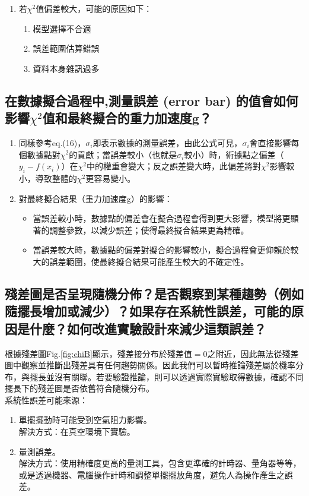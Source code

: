 \documentclass[12pt,a4paper]{article}
\begin{document}
\begin{CJK}{UTF8}{bkai}
\begin{enumerate}
    \item 若$\chi^2$值偏差較大，可能的原因如下：
    \begin{enumerate}
        \item 模型選擇不合適
        \item 誤差範圍估算錯誤
        \item 資料本身雜訊過多
    \end{enumerate}
        
\end{enumerate}

\subsection{在數據擬合過程中,測量誤差 (error bar) 的值會如何影響$\chi^2$值和最終擬合的重力加速度g？}
\hfill
\begin{enumerate}
    \item 同樣參考eq.(16)，$\sigma_i$即表示數據的測量誤差，由此公式可見，$\sigma_i$會直接影響每個數據點對$\chi^2$的貢獻；當誤差較小（也就是$\sigma_i$較小）時，術據點之偏差（$y_i - f(x_i)$）在$\chi^2$中的權重會變大；反之誤差變大時，此偏差將對$\chi^2$影響較小，導致整體的$\chi^2$更容易變小。

    \item 對最終擬合結果（重力加速度g）的影響：
    \begin{itemize}
        \item 當誤差較小時，數據點的偏差會在擬合過程會得到更大影響，模型將更顯著的調整參數，以減少誤差；使得最終擬合結果更為精確。
        \item 當誤差較大時，數據點的偏差對擬合的影響較小，擬合過程會更仰賴於較大的誤差範圍，使最終擬合結果可能產生較大的不確定性。
    \end{itemize}
\end{enumerate}
\subsection{殘差圖是否呈現隨機分佈？是否觀察到某種趨勢（例如隨擺長增加或減少）？如果存在系統性誤差，可能的原因是什麼？如何改進實驗設計來減少這類誤差？}
\hfill

\indent 根據殘差圖Fig.\ref{fig:chiB}顯示，殘差接分布於殘差值$=0$之附近，因此無法從殘差圖中觀察並推斷出殘差具有任何趨勢關係。因此我們可以暫時推論殘差屬於機率分布，與擺長並沒有關聯。若要驗證推論，則可以透過實際實驗取得數據，確認不同擺長下的殘差圖是否依舊符合隨機分布。\\
\indent 系統性誤差可能來源：
\begin{enumerate}
    \item 單擺擺動時可能受到空氣阻力影響。\\解決方式：在真空環境下實驗。
    \item 量測誤差。\\解決方式：使用精確度更高的量測工具，包含更準確的計時器、量角器等等，或是透過機器、電腦操作計時和調整單擺擺放角度，避免人為操作產生之誤差。
\end{enumerate}



\end{CJK}
\end{document}
